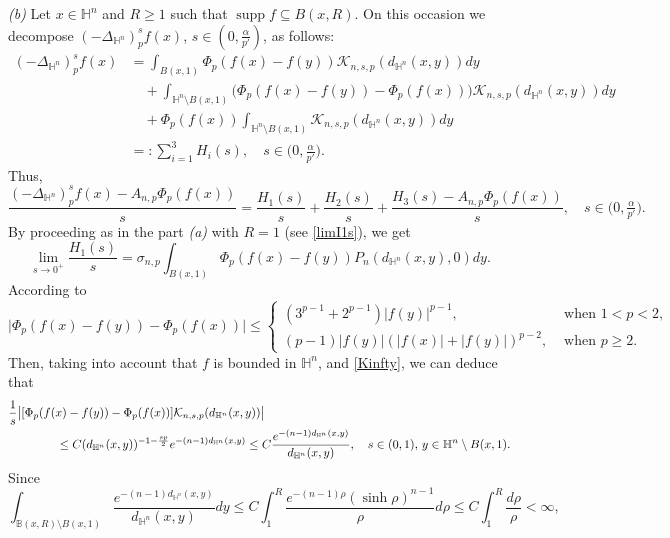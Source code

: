 \documentclass[a4paper,10pt, reqno]{amsart}
\theoremstyle{definition}
\theoremstyle{remark}
\newcommand{\supp}{\mathop{\mathrm{supp}}}
\numberwithin{equation}{section}
\begin{document}
{{\it (b)} Let $x\in \mathbb H^n$ and $R\geq 1$ such that $\supp f\subseteq B(x,R)$. On this occasion we decompose $(-\Delta_{\mathbb H^n})_p^sf(x)$, $s\in (0,\tfrac{\alpha}{p'})$, as follows:
\begin{align*}
(-\Delta_{\mathbb H^n})_p^sf(x)&=\int_{B(x,1)}\Phi_p(f(x)-f(y))\mathcal K_{n,s,p}(d_{\mathbb H^n}(x,y))dy\\
&\quad +\int_{\mathbb H^n\setminus B(x,1)}\big(\Phi_p(f(x)-f(y))-\Phi_p(f(x))\big)\mathcal K_{n,s,p}(d_{\mathbb H^n}(x,y))dy\\
&\quad +\Phi_p(f(x))\int_{\mathbb H^n\setminus B(x,1)}\mathcal K_{n,s,p}(d_{\mathbb H^n}(x,y))dy\\
&=:\sum_{i=1}^3H_i(s),\quad s\in \big(0,\tfrac{\alpha }{p'}\big).
\end{align*}
Thus,
\begin{equation}\label{coclogb}
\frac{(-\Delta_{\mathbb H^n})_p^sf(x)-A_{n,p}\Phi _p(f(x))}{s}=\frac{H_1(s)}{s}+\frac{H_2(s)}{s}+\frac{H_3(s)-A_{n,p}\Phi _p(f(x))}{s},\quad s\in \big(0,\tfrac{\alpha}{p'}\big).
\end{equation}
By proceeding as in the part {\it (a)} with $R=1$ (see \eqref{limI1s}), we get
\begin{equation}\label{H1s}
\lim_{s\rightarrow 0^+}\frac{H_1(s)}{s}=\sigma_{n,p}\int_{B(x,1)}\Phi_p(f(x)-f(y))P_n(d_{\mathbb H^n}(x,y),0)dy.
\end{equation}
According to \cite[Lemmas 2 and 3]{Lin}
\begin{equation}\label{FLin}
\big|\Phi_p(f(x)-f(y))-\Phi_p(f(x))\big|
\leq \left\{\begin{array}{ll}
            (3^{p-1}+2^{p-1})|f(y)|^{p-1},&\mbox{ when }1<p<2,\\[0.2cm]
            (p-1)|f(y)|(|f(x)|+|f(y)|)^{p-2},&\mbox{ when }p\geq 2.
            \end{array}
\right.
\end{equation}
Then, taking into account that $f$ is bounded in $\mathbb H^n$, and \eqref{Kinfty}, we can deduce that
\begin{align*}
\frac{1}{s}\big|[\Phi_p(f(x)-f(y))-\Phi_p(f(x))]\mathcal K_{n,s,p}(d_{\mathbb H^n}(x,y))&\big|\\
&\hspace{-6cm}\leq C(d_{\mathbb H^n}(x,y))^{-1-\frac{sp}{2}}e^{-(n-1)d_{\mathbb H^n}(x,y)}\leq C\frac{e^{-(n-1)d_{\mathbb H^n}(x,y)}}{d_{\mathbb H^n}(x,y)},\quad s\in (0,1),\,y\in \mathbb H^n\setminus B(x,1).
\end{align*}
Since
$$
\int_{\mathbb B(x,R)\setminus B(x,1)}\frac{e^{-(n-1)d_{\mathbb H^n}(x,y)}}{d_{\mathbb H^n}(x,y)}dy\leq C\int_1^R \frac{e^{-(n-1)\rho }(\sinh \rho )^{n-1}}{\rho }d\rho\leq C\int_1^R \frac{d\rho }{\rho }<\infty, 
$$}
\end{document}
